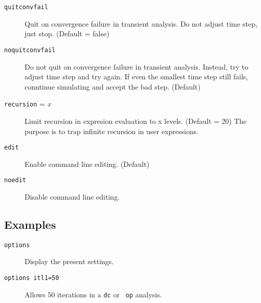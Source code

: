 \begin{description}
\item[{\tt quitconvfail}]
Quit on convergence failure in transient analysis.  Do not adjust time
step, just stop.  (Default = false)

\item[{\tt noquitconvfail}]
Do not quit on convergence failure in transient analysis.  Instead,
try to adjust time step and try again.  If even the smallest time step
still fails, conntinue simulating and accept the bad step.  (Default)

\item[{\tt recursion} = {\it x}]
Limit recursion in expresion evaluation to x levels.  (Default = 20)
The purpose is to trap infinite recursion in user expressions.

\item[{\tt edit}] Enable command line editing. (Default)

\item[{\tt noedit}] Disable command line editing.

\end{description}
\subsection{Examples}

\begin{description}

\item[{\tt options}] Display the present settings.

\item[{\tt options  itl1=50}] Allows 50 iterations in a {\tt dc} or {\tt
op} analysis.

\end{description}
